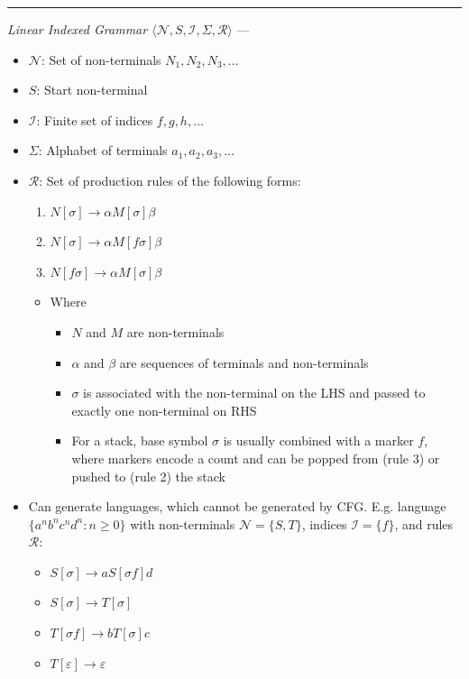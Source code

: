 {\color{lightgray}\hrule height 0.001mm}

\emph{Linear Indexed Grammar $\langle \mathcal{N}, S, \mathcal{I}, \Sigma, \mathcal{R} \rangle$} --- 
\begin{itemize}
    \item $\mathcal{N}$: Set of non-terminals $N_1, N_2, N_3, \dots$
    \item $S$: Start non-terminal
    \item $\mathcal{I}$: Finite set of indices $f, g, h, \dots$
    \item $\Sigma$: Alphabet of terminals $a_1, a_2, a_3, \dots$
    \item $\mathcal{R}$: Set of production rules of the following forms:
    \begin{enumerate}
        \item $N[\sigma] \to \alpha M[\sigma]\beta$
        \item $N[\sigma] \to \alpha M[f\sigma]\beta$
        \item $N[f\sigma] \to \alpha M[\sigma]\beta$
    \end{enumerate}
    \begin{itemize}
        \item Where
        \begin{itemize}
            \item $N$ and $M$ are non-terminals
            \item $\alpha$ and $\beta$ are sequences of terminals and non-terminals
            \item $\sigma$ is associated with the non-terminal on the LHS and passed to exactly one non-terminal on RHS
            \item For a stack, base symbol $\sigma$ is usually combined with a marker $f$, where markers encode a count and can be popped from (rule 3) or pushed to (rule 2) the stack
        \end{itemize}
    \end{itemize}
    \item Can generate languages, which cannot be generated by CFG. E.g. language $\{a^n b^n c^n d^n : n \geq 0\}$ with non-terminals $\mathcal{N} = \{ S, T\}$, indices $\mathcal{I} = \{ f \}$, and rules $\mathcal{R}$:
    \begin{itemize}
        \item $S[\sigma] \to aS[\sigma f]d$
        \item $S[\sigma] \to T[\sigma]$
        \item $T[\sigma f] \to bT[\sigma]c$
        \item $T[\varepsilon] \to \varepsilon$
    \end{itemize} 
\end{itemize}

